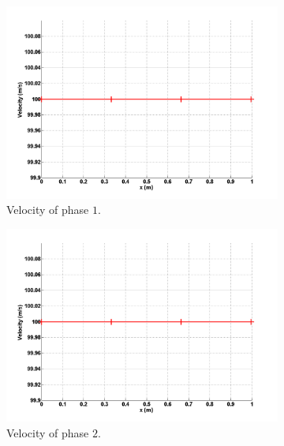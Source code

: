 %
\begin{figure}[H]
        \centering
        \begin{subfigure}[b]{0.495\textwidth}
                \centering
                \includegraphics[width=\textwidth]{figures/SEM/liquid_velocity.png}
                \caption{Velocity of phase $1$.}
                \label{ig:vel-1-7-eqn-sect4}
        \end{subfigure}%
        \begin{subfigure}[b]{0.495\textwidth}
                \centering
                \includegraphics[width=\textwidth]{figures/SEM/vapor_velocity.png}
                \caption{Velocity of phase $2$.}
                \label{ig:vel-2-7-eqn-sect4}
        \end{subfigure}
        \caption{\label{fig:vel-7-sect4}}
\end{figure}
